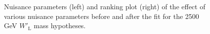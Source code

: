 \begin{figure}[H]
  \centering
  \caption{Nuisance parameters (left) and ranking plot (right) of the effect of various nuisance parameters before and after the fit for the 2500 GeV $W'_{\text{L}}$ mass hypotheses.}
  \label{fig:NuisParAndRanking_WpLH2500}
\end{figure}
